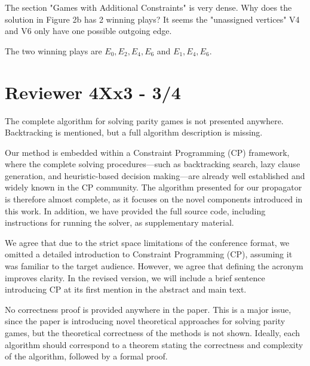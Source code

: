 \documentclass{article}
\begin{document}
\begin{reviewer}
The section "Games with Additional Constraints" is very dense. Why does the solution in Figure 2b has 2 winning plays? It seems the "unassigned vertices" V4 and V6 only have one possible outgoing edge.
\end{reviewer}

The two winning plays are $E_0, E_2, E_4, E_6$ and $E_1, E_4, E_6$.


\section{Reviewer 4Xx3 - 3/4}

\begin{reviewer}
The complete algorithm for solving parity games is not presented anywhere. Backtracking is mentioned, but a full algorithm description is missing.
\end{reviewer}

Our method is embedded within a Constraint Programming (CP) framework, where the complete solving procedures—such as backtracking search, lazy clause generation, and heuristic-based decision making—are already well established and widely known in the CP community. The algorithm presented for our propagator is therefore almost complete, as it focuses on the novel components introduced in this work. In addition, we have provided the full source code, including instructions for running the solver, as supplementary material.

We agree that due to the strict space limitations of the conference format, we omitted a detailed introduction to Constraint Programming (CP), assuming it was familiar to the target audience. However, we agree that defining the
acronym improves clarity. In the revised version, we will include a brief sentence introducing CP at its first
mention in the abstract and main text.

\begin{reviewer}
No correctness proof is provided anywhere in the paper. This is a major issue, since the paper is introducing novel theoretical approaches for solving parity games, but the theoretical correctness of the methods is not shown. Ideally, each algorithm should correspond to a theorem stating the correctness and complexity of the algorithm, followed by a formal proof.
\end{reviewer}
\end{document}
